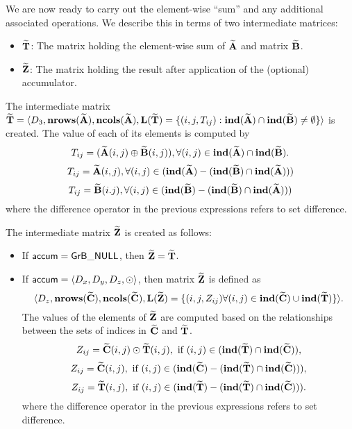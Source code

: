 We are now ready to carry out the element-wise ``sum'' and any additional 
associated operations.  We describe this in terms of two intermediate matrices:
\begin{itemize}
	\item ${\bf \widetilde{T}}$: The matrix holding the element-wise sum of
    ${\bf \widetilde{A}}$ and matrix ${\bf \widetilde{B}}$.
	\item ${\bf \widetilde{Z}}$: The matrix holding the result after 
    application of the (optional) accumulator.
\end{itemize}

The intermediate matrix ${\bf \widetilde{T}} = \langle
D_3, \bold{nrows}({\bf \widetilde{A}}), \bold{ncols}({\bf \widetilde{A}}),
\bold{L}({\bf \widetilde{T}}) =
\{(i,j,T_{ij}) : \bold{ind}({\bf \widetilde{A}}) \cap 
\bold{ind}({\bf \widetilde{B}})
 \neq \emptyset \} \rangle$
is created.  The value of each of its elements is computed by 
\[T_{ij} = ({\bf \widetilde{A}}(i,j) \oplus {\bf \widetilde{B}}(i,j)), \forall (i,j) \in \bold{ind}({\bf \widetilde{A}}) \cap \bold{ind}({\bf \widetilde{B}}).\]
\[T_{ij} = {\bf \widetilde{A}}(i,j), \forall (i,j) \in (\bold{ind}({\bf \widetilde{A}}) - (\bold{ind}({\bf \widetilde{B}}) \cap \bold{ind}({\bf \widetilde{A}})))\]
\[T_{ij} = {\bf \widetilde{B}}(i.j), \forall (i,j) \in (\bold{ind}({\bf \widetilde{B}}) - (\bold{ind}({\bf \widetilde{B}}) \cap \bold{ind}({\bf \widetilde{A}})))\]
where the difference operator in the previous expressions refers to set difference.


The intermediate matrix ${\bf \widetilde{Z}}$ is created as follows:
\begin{itemize}
    \item If ${\sf accum} = {\sf GrB\_NULL}$, then ${\bf \widetilde{Z}} = {\bf \widetilde{T}}$.

    \item If ${\sf accum} = \langle D_x, D_y, D_z, \odot \rangle$, then matrix ${\bf \widetilde{Z}}$ is defined as 
        \[ \langle D_z, \bold{nrows}({\bf \widetilde{C}}), \bold{ncols}({\bf \widetilde{C}}), \bold{L}({\bf \widetilde{Z}})
		= \{(i,j,Z_{ij})  \forall (i,j) \in \bold{ind}({\bf \widetilde{C}}) \cup 
        \bold{ind}({\bf \widetilde{T}}) \} \rangle.\]
    The values of the elements of ${\bf \widetilde{Z}}$ are computed based on the 
    relationships between the sets of indices in ${\bf \widetilde{C}}$ and 
    ${\bf \widetilde{T}}$.
\[
Z_{ij} = {\bf \widetilde{C}}(i,j) \odot {\bf \widetilde{T}}(i,j), \ \mbox{if}\  (i,j) \in  (\bold{ind}({\bf \widetilde{T}}) \cap \bold{ind}({\bf \widetilde{C}})),
\]
\[
Z_{ij} = \matrix{\widetilde{C}}(i,j), \ \mbox{if}\  (i,j) \in  (\bold{ind}(\matrix{\widetilde{C}}) - (\bold{ind}(\matrix{\widetilde{T}}) \cap \bold{ind}(\matrix{\widetilde{C}}))),
\]
\[
Z_{ij} = \matrix{\widetilde{T}}(i,j), \ \mbox{if}\  (i,j) \in  (\bold{ind}(\matrix{\widetilde{T}}) - (\bold{ind}(\matrix{\widetilde{T}}) \cap \bold{ind}(\matrix{\widetilde{C}}))).
\]
where the difference operator in the previous expressions refers to set difference.
\end{itemize}

